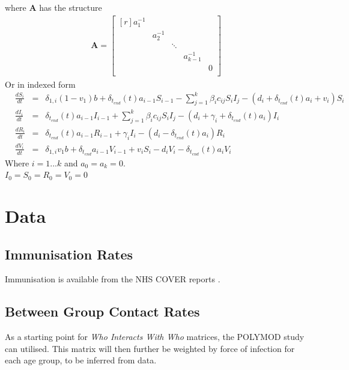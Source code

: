 \documentclass{article}
\theoremstyle{definition}
\begin{document}
  where $\mathbf{A}$ has the structure
\begin{gather*}
\mathbf{A}=\begin{bmatrix}[r]
  a_1^{-1} &            &           &              &   \\
           &   a_2^{-1} &           &              &   \\
           &            & \ddots    &              &   \\
           &            &           & a_{k-1}^{-1} &   \\
           &            &           &              & 0 \\
\end{bmatrix}
\end{gather*}
Or in indexed form
\begin{align*}
  &\frac{dS_{i}}{dt}&=&\delta_{1,i}(1-v_1)b + \delta_{t_{end}}(t)a_{i-1}S_{i-1}-\sum_{j=1}^{k}\beta_{i}c_{ij}S_{i}I_{j}-(d_{i} + \delta_{t_{end}}(t)a_{i} + v_{i})S_{i}\\
  &\frac{dI_{i}}{dt} &=&\delta_{t_{end}}(t)a_{i-1}I_{i-1}+\sum_{j=1}^{k}\beta_{i}c_{ij}S_{i}I_{j}-(d_{i}+\gamma_{i}+\delta_{t_{end}}(t)a_{i})I_{i}\\
  &\frac{dR_{i}}{dt} &=& \delta_{t_{end}}(t)a_{i-1}R_{i-1}+\gamma_{i}I_{i}-(d_{i}-\delta_{t_{end}}(t)a_{i})R_{i}\\
  &\frac{dV_{i}}{dt} &=& \delta_{1,i}v_1b+\delta_{t_{end}}a_{i-1}V_{i-1}+v_iS_i-d_{i}V_{i}-\delta_{t_{end}}(t)a_{i}V_{i}
\end{align*}
Where $i=1...k$ and $a_0 = a_k = 0$.\\
$I_0=S_0=R_0=V_0=0$\\
\section{Data}
\subsection{Immunisation Rates}
Immunisation is available from the NHS COVER reports \cite{noauthor_childhood_nodate}.
\subsection{Between Group Contact Rates}
As a starting point for \emph{Who Interacts With Who} matrices, the POLYMOD study \cite{mossong_social_2008} can utilised. This matrix will then further be weighted by force of infection for each age group, to be inferred from data.
\end{document}

